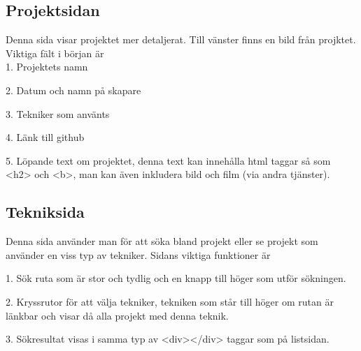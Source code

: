 \documentclass{TDP003mall}
\begin{document}
\subsection{Projektsidan}
Denna sida visar projektet mer detaljerat. Till vänster finns en bild från projktet. Viktiga fält i början är \\

1. Projektets namn 

2. Datum och namn på skapare

3. Tekniker som använts 

4. Länk till github

5. Löpande text om projektet, denna text kan innehålla html taggar så som <h2> och <b>, man kan även inkludera bild och film (via andra tjänster). 


\subsection{Tekniksida}
Denna sida använder man för att söka bland projekt eller se projekt som använder en viss typ av tekniker. Sidans viktiga funktioner är

1. Sök ruta som är stor och tydlig och en knapp till höger som utför sökningen. 

2. Kryssrutor för att välja tekniker, tekniken som står till höger om rutan är länkbar och visar då alla projekt med denna teknik. 

3. Sökresultat visas i samma typ av <div></div> taggar som på listsidan. 
\end{document}
